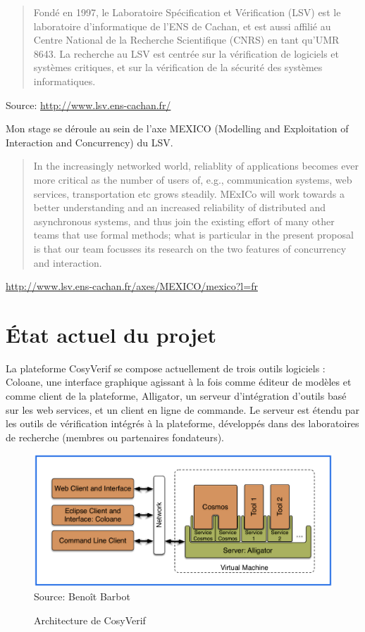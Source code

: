 \documentclass{report}
\begin{document}
\begin{quotation}
Fondé en 1997, le Laboratoire Spécification et Vérification (LSV) est le laboratoire d'informatique de l'ENS de Cachan, 
et est aussi affilié au Centre National de la Recherche Scientifique (CNRS) en tant qu'UMR 8643. La recherche au LSV est
centrée sur la vérification de logiciels et systèmes critiques, et sur la vérification de la sécurité des systèmes informatiques.
\end{quotation}
\hfill{Source: \url{http://www.lsv.ens-cachan.fr/}}

Mon stage se déroule au sein de l'axe MEXICO (Modelling and Exploitation of
Interaction and Concurrency) du LSV.

\begin{quotation}
In the increasingly networked world, reliablity of applications becomes ever more critical as the number of users of, e.g., communication systems, web services, transportation etc grows steadily. MExICo will work towards a better understanding and an increased reliability of distributed and asynchronous systems, and thus join the existing effort of many other teams that use formal methods; what is particular in the present proposal is that our team focusses its research on the two features of concurrency and interaction.
\end{quotation}
\hfill{\url{http://www.lsv.ens-cachan.fr/axes/MEXICO/mexico?l=fr}}

\section{État actuel du projet}

La plateforme CosyVerif se compose actuellement de trois outils logiciels :
Coloane, une interface graphique agissant à la fois comme éditeur de modèles
et comme client de la plateforme,
Alligator, un serveur d'intégration d'outils basé sur les web services,
et un client en ligne de commande.
Le serveur est étendu par les outils de vérification intégrés à la plateforme,
développés dans des laboratoires de recherche (membres ou partenaires fondateurs).

\begin{figure}[h!]
    \centering
    \includegraphics[scale=0.50]{img/cosyverif_schema.pdf}
    \\
    \hfill{Source: Benoît Barbot}
    \caption{Architecture de CosyVerif}
\end{figure}
\end{document}
